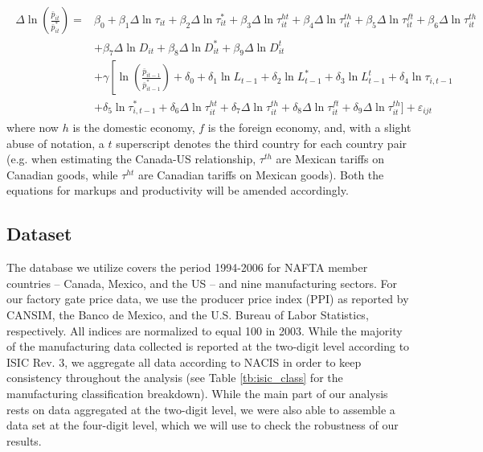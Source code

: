 \documentclass[a4paper,12pt]{article}
\begin{document}
\begin{align}
\begin{split}\label{eq:gw-estimation-prices-third-country}
\Delta \ln \left( \frac{\bar{p}_{it}}{\bar{p}_{it}^*} \right) = 
&\beta_0 + \beta_1 \Delta \ln \tau_{it} + \beta_2 \Delta \ln \tau_{it}^* + \beta_3 \Delta \ln \tau_{it}^{ht} 
+ \beta_4 \Delta \ln \tau_{it}^{th} + \beta_5 \Delta \ln \tau_{it}^{ft} + \beta_6 \Delta \ln \tau_{it}^{th} \\ 
&+ \beta_7 \Delta \ln D_{it} + \beta_8 \Delta \ln D_{it}^* + \beta_9 \Delta \ln D_{it}^t \\ 
&+ \gamma \left[ \ln \left( \frac{\bar{p}_{it-1}}{\bar{p}_{it-1}^*} \right) + \delta_0 + \delta_1 \ln L_{t-1} + \delta_2\ln L_{t-1}^* 
 + \delta_3 \ln L_{t-1}^t+ \delta_4 \ln \tau_{i,t-1} \right. \\ 
&+ \left. \delta_5 \ln  \tau_{i,t-1}^*  + \delta_6 \Delta \ln \tau_{it}^{ht} + \delta_7 \Delta \ln \tau_{it}^{th} 
 + \delta_8 \Delta \ln \tau_{it}^{ft} + \delta_9 \Delta \ln \tau_{it}^{th} \bigg] \right. + \varepsilon_{ijt} 
\end{split}\end{align}
where now $h$ is the domestic economy, $f$ is the foreign economy, and, with a slight abuse of notation, a $t$ superscript denotes the third country for each country pair (e.g. when estimating the Canada-US relationship, $\tau^{th}$ are Mexican tariffs on Canadian goods, while $\tau^{ht}$ are Canadian tariffs on Mexican goods). Both the equations for markups and productivity will be amended accordingly. 

\subsection{Dataset}

The database we utilize covers the period 1994-2006 for NAFTA member countries -- Canada, Mexico, and the US -- and nine manufacturing sectors. For our factory gate price data, we use the producer price index (PPI) as reported by CANSIM, the Banco de Mexico, and the U.S. Bureau of Labor Statistics, respectively. All indices are normalized to equal 100 in 2003. While the majority of the manufacturing data collected is reported at the two-digit level according to ISIC Rev. 3, we aggregate all data according to NACIS in order to keep consistency throughout the analysis (see Table \ref{tb:isic_class} for the manufacturing classification breakdown). While the main part of our analysis rests on data aggregated at the two-digit level, we were also able to assemble a data set at the four-digit level, which we will use to check the robustness of our results. 
\end{document}
